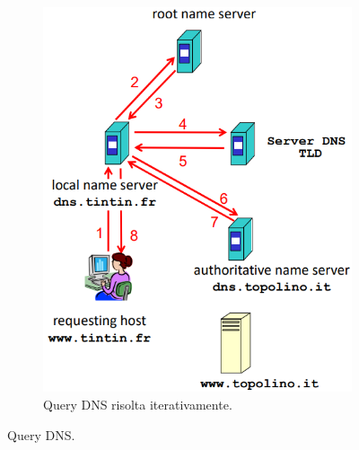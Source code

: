 \documentclass[11pt, italian, openany]{book}
\begin{document}
\begin{sloppypar}
\begin{figure}[!h]
\begin{subfigure}[t]{0.49 \linewidth}
		\includegraphics[scale=0.35]{images/dns-query-iterativa.png}
		\caption{Query DNS risolta iterativamente.}
	\end{subfigure}
	\caption{Query DNS.}
	\label{fig:dns-query}
\end{figure}

\pagebreak


\end{sloppypar}
\end{document}
